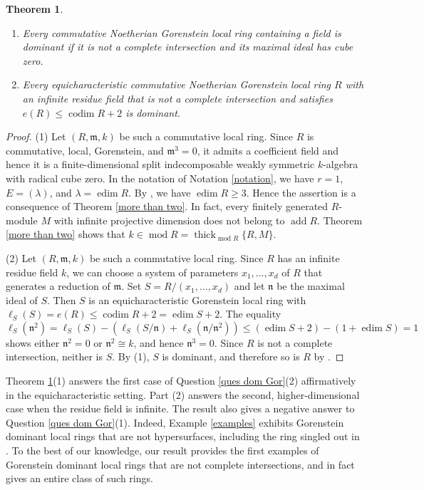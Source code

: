 \documentclass{amsart}
\newtheorem{thm}{Theorem}[section]
\theoremstyle{definition}
\theoremstyle{remark}
\numberwithin{equation}{thm}
\def\add{\operatorname{add}}
\def\codim{\operatorname{codim}}
\def\edim{\operatorname{edim}}
\def\le{\leqslant}
\def\ge{\geqslant}
\def\m{\mathfrak{m}}
\def\mod{\operatorname{mod}}
\def\n{\mathfrak{n}}
\def\thick{\operatorname{thick}}
\begin{document}
\begin{thm}\label{main commutative}
\begin{enumerate}[{\rm (1)}]
\item Every commutative Noetherian Gorenstein local ring containing a field is dominant if it is not a complete intersection and its maximal ideal has cube zero.
\item Every equicharacteristic commutative Noetherian Gorenstein local ring $R$ with an infinite residue field that is not a complete intersection and satisfies $e(R)\le \codim R+2$ is dominant.
\end{enumerate}
\end{thm}

\begin{proof}
(1) Let $(R,\m,k)$ be such a commutative local ring. Since $R$ is commutative, local, Gorenstein, and $\m^3=0$, it admits a coefficient field and hence it is a finite-dimensional split indecomposable weakly symmetric $k$-algebra with radical cube zero. 
In the notation of Notation \ref{notation}, we have $r=1$, $E=(\lambda)$, and $\lambda=\edim R$.
By \cite[Lemma 7.2(1)]{KT}, we have $\edim R\ge 3$.
Hence the assertion is a consequence of Theorem \ref{more than two}.
In fact, every finitely generated $R$-module $M$ with infinite projective dimension does not belong to $\add R$.
Theorem \ref{more than two} shows that $k\in \mod R=\thick_{\mod R}\{R,M\}$.

(2) Let $(R,\m,k)$ be such a commutative local ring. Since $R$ has an infinite residue field $k$, we can choose a system of parameters $x_1,\ldots, x_d$ of $R$ that generates a reduction of $\m$. Set $S=R/(x_1,\ldots, x_d)$ and let $\n$ be the maximal ideal of $S$. Then $S$ is an equicharacteristic Gorenstein local ring with $\ell_S(S)=e(R)\le \codim R+2=\edim S+2$. The equality 
$$
\ell_S(\n^2)=\ell_S(S)-(\ell_S(S/\n)+\ell_S(\n/\n^2))\le (\edim S+2)-(1+\edim S)=1
$$
shows either $\n^2=0$ or $\n^2\cong k$, and hence $\n^3=0$. Since $R$ is not a complete intersection, neither is $S$. By (1), $S$ is dominant, and therefore so is $R$ by \cite[Theorem 5.6]{T23}.
\end{proof}

Theorem \ref{main commutative}(1) answers the first case of Question \ref{ques dom Gor}(2) affirmatively in the equicharacteristic setting. 
Part (2) answers the second, higher-dimensional case when the residue field is infinite.
The result also gives a negative answer to Question \ref{ques dom Gor}(1).
Indeed, Example \ref{examples} exhibits Gorenstein dominant local rings that are not hypersurfaces, including the ring singled out in \cite[Remark 9.7]{T23}.
To the best of our knowledge, our result provides the first examples of Gorenstein dominant local rings that are not complete intersections, and in fact gives an entire class of such rings.
\end{document}
